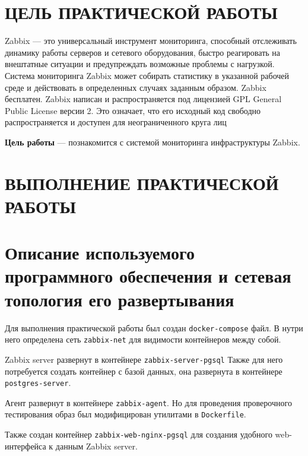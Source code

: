 \section*{ЦЕЛЬ ПРАКТИЧЕСКОЙ РАБОТЫ}

Zabbix --- это универсальный инструмент мониторинга, способный
отслеживать динамику работы серверов и сетевого оборудования, быстро
реагировать на внештатные ситуации и предупреждать возможные проблемы
с нагрузкой.
Система мониторинга Zabbix может собирать статистику в
указанной рабочей среде и действовать в определенных случаях заданным
образом.
Zabbix бесплатен.
Zabbix написан и распространяется под лицензией
GPL General Public License версии 2.
Это означает, что его исходный код
свободно распространяется и доступен для неограниченного круга лиц

\textbf{Цель работы} --- познакомится с системой мониторинга
инфраструктуры Zabbix.

\clearpage

\section*{ВЫПОЛНЕНИЕ ПРАКТИЧЕСКОЙ РАБОТЫ}

\section{Описание используемого программного обеспечения
и сетевая топология его развертывания}

Для выполнения практической работы был создан \texttt{docker-compose} файл.
В нутри него определена сеть \texttt{zabbix-net} для видимости контейнеров
между собой.



Zabbix server развернут в контейнере \texttt{zabbix-server-pgsql}
Также для него потребуется создать контейнер с базой данных, она
развернута в контейнере \texttt{postgres-server}.\par
Агент развернут в контейнере \texttt{zabbix-agent}.
Но для проведения проверочного тестирования образ был модифицирован утилитами
в \texttt{Dockerfile}.



Также создан контейнер \texttt{zabbix-web-nginx-pgsql} для создания
удобного web-интерфейса к данным Zabbix server.

